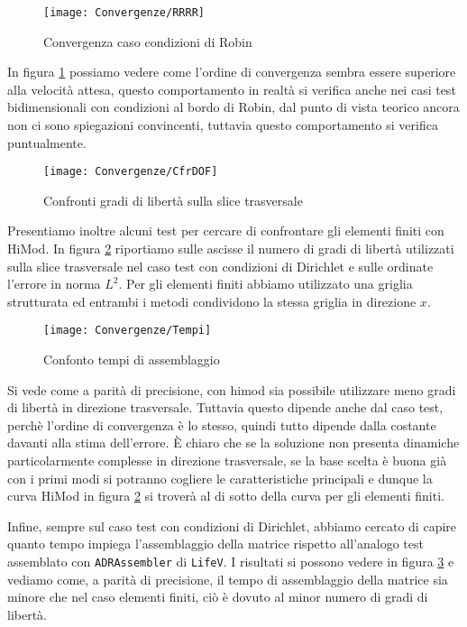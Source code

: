 \begin{figure}[!h]
\centering
\texttt{[image: Convergenze/RRRR]}
\caption{Convergenza caso condizioni di Robin}
\label{fig:rrrr_conv}
\end{figure}

In figura \ref{fig:rrrr_conv} possiamo 
vedere come l'ordine di convergenza sembra essere superiore alla velocit\`a attesa, questo comportamento in realt\`a 
si verifica anche nei casi test bidimensionali con condizioni al bordo di Robin, dal punto di vista teorico ancora non ci sono 
spiegazioni convincenti, tuttavia questo comportamento si verifica puntualmente.

\begin{figure}[!h]
\centering
\texttt{[image: Convergenze/CfrDOF]}
\caption{Confronti gradi di libert\`a sulla slice trasversale}
\label{fig:dof}
\end{figure}

Presentiamo inoltre alcuni test per cercare di confrontare gli elementi finiti con HiMod.
In figura \ref{fig:dof} riportiamo sulle ascisse il numero di gradi di libert\`a utilizzati sulla slice trasversale nel caso test con condizioni di Dirichlet e sulle ordinate l'errore in norma $L^2$.
Per gli elementi finiti abbiamo utilizzato una griglia strutturata ed entrambi i metodi condividono la stessa griglia 
in direzione $x$.

\begin{figure}[!h]
\centering
\texttt{[image: Convergenze/Tempi]}
\caption{Confonto tempi di assemblaggio}
\label{fig:time}
\end{figure}

Si vede come a parit\`a di precisione, con himod sia possibile utilizzare meno gradi di libert\`a in direzione trasversale.
Tuttavia questo dipende anche dal caso test, perch\`e l'ordine di convergenza \`e lo stesso, quindi tutto dipende dalla 
costante davanti alla stima dell'errore. \`E chiaro che se la soluzione non presenta dinamiche particolarmente complesse in direzione trasversale,
se la base scelta \`e buona gi\`a con i primi modi si potranno cogliere le caratteristiche principali e dunque la curva HiMod
in figura \ref{fig:dof} si trover\`a al di sotto della curva per gli elementi finiti.

Infine, sempre sul caso test con condizioni di Dirichlet, abbiamo cercato di capire quanto tempo impiega l'assemblaggio della matrice
rispetto all'analogo test assemblato con \texttt{ADRAssembler} di \texttt{LifeV}.
I risultati si possono vedere in figura \ref{fig:time} e vediamo come, a parit\`a di precisione, il tempo di assemblaggio 
della matrice sia minore che nel caso elementi finiti, ci\`o \`e dovuto al minor numero di gradi di libert\`a.
